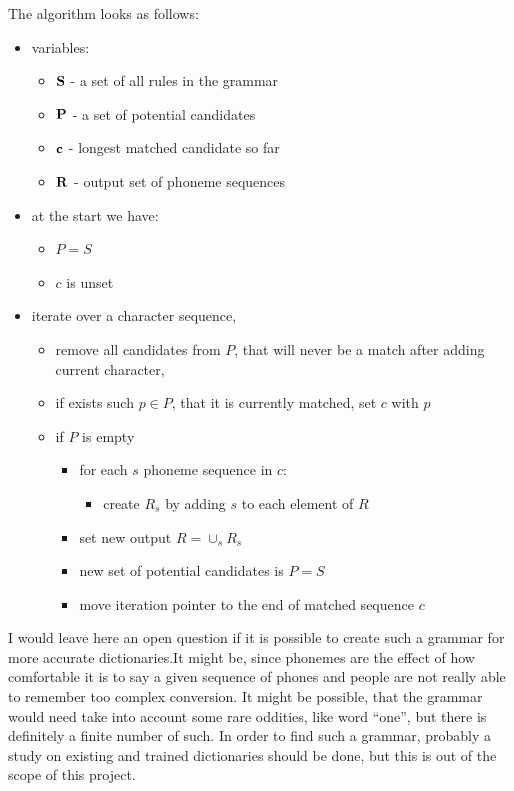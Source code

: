 \documentclass[12pt,a4paper,english]{article}
\begin{document}
The algorithm looks as follows:
\begin{itemize}
    \item variables:
    \begin{itemize}
        \item $\bold{S}$ - a set of all rules in the grammar
        \item $\bold{P}$ - a set of potential candidates
        \item $\bold{c}$ - longest matched candidate so far
        \item $\bold{R}$ - output set of phoneme sequences
    \end{itemize}
    \item at the start we have:
    \begin{itemize}
        \item $P = S$
        \item $c$ is unset
    \end{itemize}
    \item iterate over a character sequence,
    \begin{itemize}
        \item remove all candidates from $P$, that will never be a match after adding current character,
        \item if exists such $p \in P$, that it is currently matched, set $c$ with $p$
        \item if $P$ is empty
        \begin{itemize}
            \item for each $s$ phoneme sequence in $c$:
            \begin{itemize}
                \item create $R_s$ by adding $s$ to each element of $R$
            \end{itemize}
            \item set new output $R = \cup_s R_s$ 
            \item new set of potential candidates is $P=S$
            \item move iteration pointer to the end of matched sequence $c$ 
        \end{itemize}
    \end{itemize}

\end{itemize}

I would leave here an open question if it is possible to create such a grammar for more accurate dictionaries.It might be, since phonemes are the effect of how comfortable it is to say a given sequence of phones and people are not really able to remember too complex conversion. It might be possible, that the grammar would need take into account some rare oddities, like word “one”, but there is definitely a finite number of such. In order to find such a grammar, probably a study on existing and trained dictionaries should be done, but this is out of the scope of this project.
\end{document}
